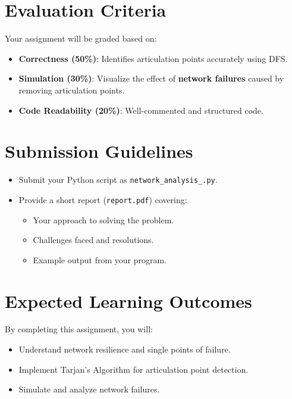 \documentclass{article}
\begin{document}
\section{Evaluation Criteria}
Your assignment will be graded based on:
\begin{itemize}
    \item \textbf{Correctness (50\%)}: Identifies articulation points accurately using DFS.
    \item \textbf{Simulation (30\%)}: Visualize the effect of \textbf{network failures} caused by removing articulation points.
    \item \textbf{Code Readability (20\%)}: Well-commented and structured code.
\end{itemize}

\section{Submission Guidelines}
\begin{itemize}
    \item Submit your Python script as \texttt{network\_analysis\_<Your name>.py}.
    \item Provide a short report (\texttt{report.pdf}) covering:
          \begin{itemize}
            \item Your approach to solving the problem.
            \item Challenges faced and resolutions.
            \item Example output from your program.
          \end{itemize}
\end{itemize}

\section{Expected Learning Outcomes}
By completing this assignment, you will:
\begin{itemize}
    \item Understand network resilience and single points of failure.
    \item Implement Tarjan’s Algorithm for articulation point detection.
    \item Simulate and analyze network failures.
\end{itemize}
\end{document}
